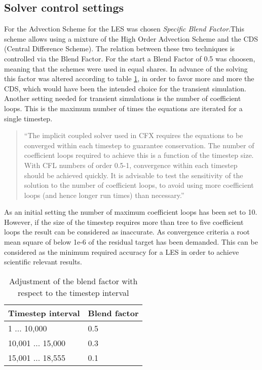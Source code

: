\subsection{Solver control settings}
For the Advection Scheme for the LES was chosen \emph{Specific Blend Factor}.This scheme allows using a mixture of the High Order Advection Scheme and the CDS (Central Difference Scheme). The relation between these two techniques is controlled via the Blend Factor. For the start a Blend Factor of 0.5 was choosen, meaning that the schemes were used in equal shares. In advance of the solving this factor was altered according to table \ref{tab:blend_factor}, in order to favor more and more the CDS, which would have been the intended choice for the transient simulation. 
Another setting needed for transient simulations is the number of coefficient loops. This is the maximum number of times the equations are iterated for a single timestep.
\begin{quote}
``The implicit coupled solver used in CFX requires the equations to be converged within each timestep to guarantee conservation. The number of coefficient loops required to achieve this is a function of the timestep size. With CFL numbers of order 0.5-1, convergence within each timestep should be achieved quickly. It is advisable to test the sensitivity of the solution to the number of coefficient loops, to avoid using more coefficient loops (and hence longer run times) than necessary.''
\end{quote}
As an initial setting the number of maximum coefficient loops has been set to 10. However, if the size of the timestep requires more than tree to five coefficient loops the result can be considered as inaccurate.
As convergence criteria a root mean square of below 1e-6 of the residual target has been demanded. This can be considered as the minimum required accuracy for a LES in order to achieve scientific relevant results.
\begin{table}[ht]
\centering
\caption{Adjustment of the blend factor with respect to the timestep interval}
\label{tab:blend_factor}
\begin{tabular}{ll}
Timestep interval&Blend factor\\
\hline
1 ... 10,000&0.5\\
10,001 ... 15,000&0.3\\
15,001 ... 18,555&0.1\\
\end{tabular}
\end{table}

